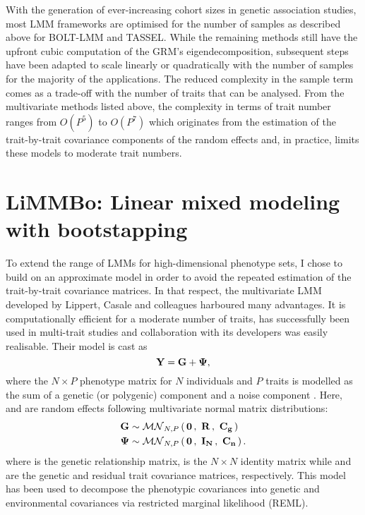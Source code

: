 With the generation of ever-increasing cohort sizes in genetic association studies, most LMM frameworks are optimised for the number of samples as described above for BOLT-LMM and TASSEL. While the remaining methods still have the upfront cubic computation of the GRM's eigendecomposition, subsequent steps have been adapted to scale linearly or quadratically with the number of samples for the majority of the applications. The reduced complexity in the sample term comes as a trade-off with the number of traits that can be analysed. From the multivariate methods listed above, the complexity in terms of trait number ranges from \(O(P^5)\) to \(O(P^7)\) which originates from the estimation of the trait-by-trait covariance components of the random effects and, in practice, limits these models to moderate trait numbers.

\section{LiMMBo: Linear mixed modeling with bootstapping}
\label{section:intro-limmbo}
To extend the range of LMMs for high-dimensional phenotype sets, I chose to build on an approximate model in order to avoid the repeated estimation of the trait-by-trait covariance matrices. In that respect, the multivariate LMM developed by Lippert, Casale and colleagues \citep{Lippert2014,Casale2015} harboured many advantages. It is computationally efficient for a moderate number of traits, has successfully  been used in multi-trait studies \citep{Cannavo2016,Schor2017} and collaboration with its developers was easily realisable. 
Their model is cast as
\begin{equation}
\boldsymbol{\mathbf{Y}} = \boldsymbol{\mathbf{G}} + \boldsymbol{\mathbf{\Psi}},
\label{eq:vd}
\end{equation}
%
where the \(N \times P\) phenotype matrix  for \(N\) individuals and \(P\) traits is modelled as the sum of a genetic (or polygenic) component  and a noise component \tmat{\Psi}. Here,  and  are random effects following multivariate normal matrix distributions:
\begin{equation}
\begin{aligned}
\boldsymbol{\mathbf{G}} &\sim\mathcal{MN}_{N,P}\left(\, \boldsymbol{\mathbf{{\boldsymbol{\mathbf{0}}}}} \,,~\boldsymbol{\mathbf{{\boldsymbol{\mathbf{R}}}}}\,,~\boldsymbol{\mathbf{{\boldsymbol{\mathbf{C}}_{g}}}} \,\right)  \\
\boldsymbol{\mathbf{\Psi}} &\sim\mathcal{MN}_{N,P}\left(\, \boldsymbol{\mathbf{{\boldsymbol{\mathbf{0}}}}} \,,~\boldsymbol{\mathbf{{\boldsymbol{\mathbf{I}}_N}}}\,,~\boldsymbol{\mathbf{{\boldsymbol{\mathbf{C}}_{n}}}} \,\right).
\end{aligned}
\end{equation}
%
where  is the genetic relationship matrix,  is the \(N \times N\) identity matrix while  and  are the genetic and residual trait covariance matrices, respectively. This model has been used to decompose the phenotypic covariances into genetic and environmental covariances via restricted marginal likelihood (REML). 

